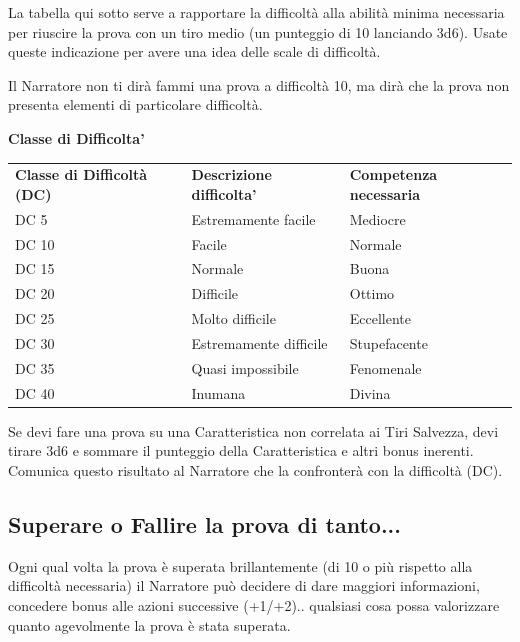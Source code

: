 \documentclass[a4paper,11pt,twoside,openany]{book}
\begin{document}
\bigskip

La tabella qui sotto serve a rapportare la difficoltà alla abilità minima necessaria per riuscire la prova con un tiro medio (un punteggio di 10 lanciando 3d6). Usate queste indicazione per avere una idea delle scale di difficoltà.

Il Narratore non ti dirà fammi una prova a difficoltà 10, ma dirà che la prova non presenta elementi di particolare difficoltà.

\bigskip

\textbf{Classe di Difficolta'}
\medskip

\begin{tabular}{lll}
	\toprule
	\textbf{Classe di Difficoltà (DC)} & \textbf{Descrizione difficolta'} & \textbf{ Competenza necessaria}\tabularnewline
	DC 5                               & Estremamente facile              & Mediocre\tabularnewline
	DC 10                              & Facile                           & Normale\tabularnewline
	DC 15                              & Normale                          & Buona\tabularnewline
	DC 20                              & Difficile                        & Ottimo\tabularnewline
	DC 25                              & Molto difficile                  & Eccellente\tabularnewline
	DC 30                              & Estremamente difficile           & Stupefacente\tabularnewline
	DC 35                              & Quasi impossibile                & Fenomenale\tabularnewline
	DC 40                              & Inumana                          & Divina\tabularnewline
\end{tabular}

\bigskip

Se devi fare una prova su una Caratteristica non correlata ai Tiri Salvezza, devi tirare 3d6 e sommare il punteggio della Caratteristica e altri bonus inerenti. Comunica questo risultato al Narratore che la confronterà con la difficoltà (DC).

\subsection{Superare o Fallire la prova di tanto...}

Ogni qual volta la prova è superata brillantemente (di 10 o più rispetto alla difficoltà necessaria) il Narratore può decidere di dare maggiori informazioni, concedere bonus alle azioni successive (+1/+2).. qualsiasi cosa possa valorizzare quanto agevolmente la prova è stata superata.
\end{document}
